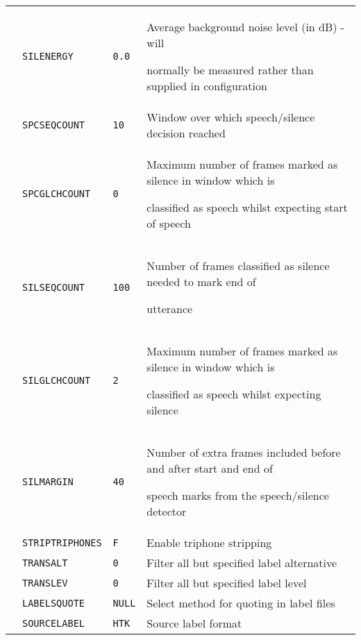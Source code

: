 \begin{center}
\begin{supertabular}{|p{1.8cm}|l|l|p{6.6cm}|}
  & \texttt{SILENERGY}    & \texttt{0.0} & Average background noise level (in dB) - will 


normally be measured rather than supplied in configuration \\ 


  & \texttt{SPCSEQCOUNT}  & \texttt{10} & Window over which speech/silence decision reached \\ 


  & \texttt{SPCGLCHCOUNT} & \texttt{0} & Maximum number of frames marked as silence in window which is


  classified as speech whilst expecting start of speech \\   


  & \texttt{SILSEQCOUNT}  & \texttt{100} & Number of frames classified as silence needed to mark end of


  utterance \\ 


  & \texttt{SILGLCHCOUNT} & \texttt{2} & Maximum number of frames marked as silence in window which is


  classified as speech whilst expecting silence \\   


  & \texttt{SILMARGIN} & \texttt{40} & Number of extra frames included before and after start and end of


  speech marks from the speech/silence detector \\ \hline







  & \texttt{STRIPTRIPHONES} & \texttt{F} & Enable triphone stripping \\ 


  & \texttt{TRANSALT} & \texttt{0} & Filter all but specified label alternative \\ 




  & \texttt{TRANSLEV} & \texttt{0} & Filter all but specified label level \\ 


  & \texttt{LABELSQUOTE} & \texttt{NULL} & Select method for quoting in label files \\ 


  & \texttt{SOURCELABEL} & \texttt{HTK} & Source label format \\ 



\end{supertabular}
\end{center}
